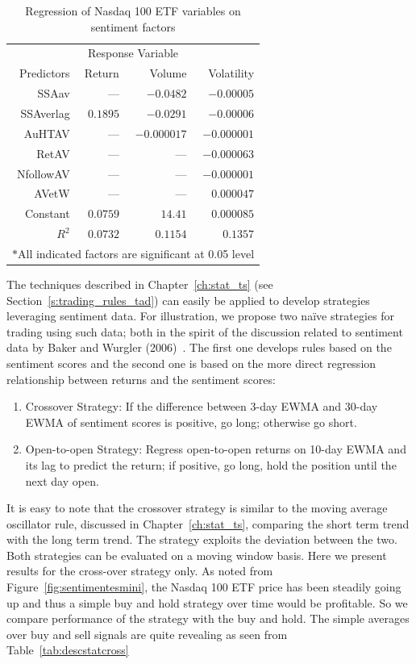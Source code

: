 	\begin{table}[!ht]
	\centering
	\caption{Regression of Nasdaq 100 ETF variables on sentiment factors \label{tab:regesmini}}
	\begin{tabular}{rrrr}
	\multicolumn{4}{c}{Response Variable} \\
	Predictors & Return & Volume & Volatility \\ \hline
	SSAav & --- & $-0.0482$ & $-0.00005$ \\
	SSAverlag & $0.1895$ & $-0.0291$ & $-0.00006$ \\
	AuHTAV & --- & $-0.000017$ & $-0.000001$ \\
	RetAV & --- & --- & $-0.000063$ \\
	NfollowAV & --- & --- & $-0.000001$ \\
	AVetW & --- & --- & $0.000047$ \\
	Constant & $0.0759$ & $14.41$ & $0.000085$ \\ \hline
	$R^2$ & $0.0732$ & $0.1154$ & $0.1357$ \\ \hline
	\multicolumn{4}{c}{$\ast$All indicated factors are significant at 0.05 level}
	\end{tabular} 
	\end{table}


The techniques described in Chapter~\ref{ch:stat_ts} (see Section~\ref{s:trading_rules_tad}) can easily be applied to develop strategies leveraging sentiment data. For illustration, we propose two na\"ive strategies for trading using such data; both in the spirit of the discussion related to sentiment data by Baker and Wurgler (2006)~\cite{baker2006investor}. The first one develops rules based on the sentiment scores and the second one is based on the more direct regression relationship between returns and the sentiment scores: 


\begin{enumerate}[1.]
\item Crossover Strategy: If the difference between 3-day EWMA and 30-day EWMA of sentiment scores is positive, go long; otherwise go short. 
\item Open-to-open Strategy: Regress open-to-open returns on 10-day EWMA and its lag to predict the return; if positive, go long, hold the position until the next day open. 
\end{enumerate}


It is easy to note that the crossover strategy is similar to the moving average oscillator rule, discussed in Chapter~\ref{ch:stat_ts}, comparing the short term trend with the long term trend. The strategy exploits the deviation between the two. Both strategies can be evaluated on a moving window basis. Here we present results for the cross-over strategy only. As noted from Figure~\ref{fig:sentimentesmini}, the Nasdaq 100 ETF price has been steadily going up and thus a simple buy and hold strategy over time would be profitable. So we compare performance of the strategy with the buy and hold. The simple averages over buy and sell signals are quite revealing as seen from Table~\ref{tab:descstatcross}

